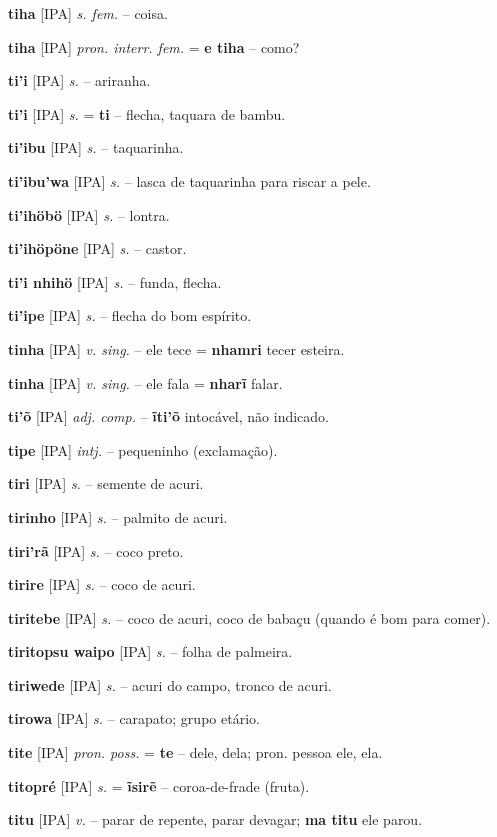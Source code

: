 \textbf{tiha} [IPA] \textit{s. fem.} -- coisa.

\textbf{tiha} [IPA] \textit{pron. interr. fem.} = \textbf{e tiha} -- como?

\textbf{ti'i} [IPA] \textit{s.} -- ariranha.

\textbf{ti'i} [IPA] \textit{s.} = \textbf{ti} -- flecha, taquara de bambu.

\textbf{ti'ibu} [IPA] \textit{s.} -- taquarinha.

\textbf{ti'ibu'wa} [IPA] \textit{s.} -- lasca de taquarinha para riscar a pele.

\textbf{ti'ihöbö} [IPA] \textit{s.} -- lontra.

\textbf{ti'ihöpöne} [IPA] \textit{s.} -- castor.

\textbf{ti'i nhihö} [IPA] \textit{s.} -- funda, flecha.

\textbf{ti'ipe} [IPA] \textit{s.} -- flecha do bom espírito.

\textbf{tinha} [IPA] \textit{v. sing.} -- ele tece = \textbf{nhamri} tecer esteira.

\textbf{tinha} [IPA] \textit{v. sing.} -- ele fala = \textbf{nharĩ} falar.

\textbf{ti'õ} [IPA] \textit{adj. comp.} -- \textbf{ĩti'õ} intocável, não indicado.

\textbf{tipe} [IPA] \textit{intj.} -- pequeninho (exclamação).

\textbf{tiri} [IPA] \textit{s.} -- semente de acuri.

\textbf{tirinho} [IPA] \textit{s.} -- palmito de acuri.

\textbf{tiri'rã} [IPA] \textit{s.} -- coco preto.

\textbf{tirire} [IPA] \textit{s.} -- coco de acuri.

\textbf{tiritebe} [IPA] \textit{s.} -- coco de acuri, coco de babaçu (quando é bom para comer).

\textbf{tiritopsu waipo} [IPA] \textit{s.} -- folha de palmeira.

\textbf{tiriwede} [IPA] \textit{s.} -- acuri do campo, tronco de acuri.

\textbf{tirowa} [IPA] \textit{s.} -- carapato; grupo etário.

\textbf{tite} [IPA] \textit{pron. poss.} = \textbf{te} -- dele, dela; pron. pessoa ele, ela.

\textbf{titopré} [IPA] \textit{s.} = \textbf{ĩsirẽ} -- coroa-de-frade (fruta).

\textbf{titu} [IPA] \textit{v.} -- parar de repente, parar devagar; \textbf{ma titu} ele parou.

